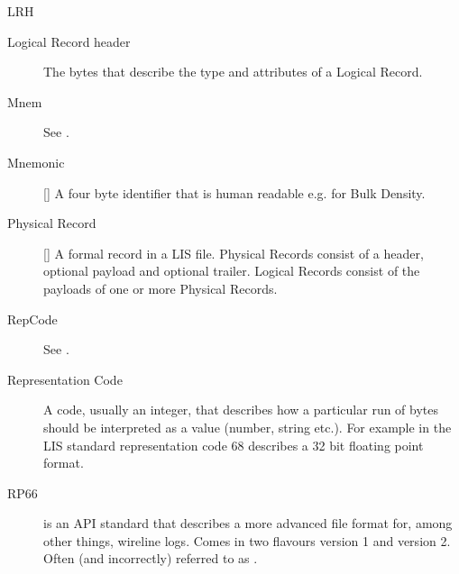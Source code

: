 \documentclass[letterpaper,10pt,english]{sphinxmanual}
\begin{document}
\begin{description}
\item[{LRH}] \leavevmode{}\label{\detokenize{glossary:term-lrh}}\item[{Logical Record header}] \leavevmode{}\label{\detokenize{glossary:term-logical-record-header}}
The bytes that describe the type and attributes of a Logical Record.

\item[{Mnem}] \leavevmode{}\label{\detokenize{glossary:term-mnem}}
See {\hyperref[\detokenize{glossary:term-mnemonic}]{}}.

\item[{Mnemonic}] \leavevmode{}\label{\detokenize{glossary:term-mnemonic}}
{[}{\hyperref[\detokenize{glossary:term-lis}]{}}{]} A four byte identifier that is human readable e.g.  for Bulk Density.

\item[{Physical Record}] \leavevmode{}\label{\detokenize{glossary:term-physical-record}}
{[}{\hyperref[\detokenize{glossary:term-lis}]{}}{]} A formal record in a LIS file. Physical Records consist of a header, optional payload and optional trailer. Logical Records consist of the payloads of one or more Physical Records.

\item[{RepCode}] \leavevmode{}\label{\detokenize{glossary:term-repcode}}
See {\hyperref[\detokenize{glossary:term-representation-code}]{}}.

\item[{Representation Code}] \leavevmode{}\label{\detokenize{glossary:term-representation-code}}
A code, usually an integer, that describes how a particular run of bytes should be interpreted as a
value (number, string etc.). For example in the LIS standard representation code 68 describes a 32 bit
floating point format.

\item[{RP66}] \leavevmode{}\label{\detokenize{glossary:term-rp66}}
 is an API standard that describes a more advanced file format for, among other things, wireline logs. Comes in two flavours version 1 and version 2. Often (and incorrectly) referred to as {\hyperref[\detokenize{glossary:term-dlis}]{}}.


\end{description}
\end{document}
